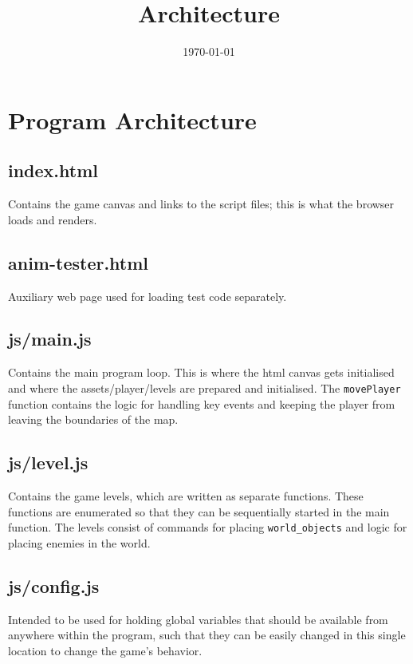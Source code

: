 \documentclass[11pt]{article}
\date{\today}
\title{Architecture}
\begin{document}
\maketitle


\section{Program Architecture}
\label{sec:orgc9acaa6}
\subsection{index.html}
\label{sec:org3660155}
Contains the game canvas and links to the script files; this is what the browser loads and renders.\\
\subsection{anim-tester.html}
\label{sec:org66015cd}
Auxiliary web page used for loading test code separately.\\
\subsection{js/main.js}
\label{sec:orgeadcae2}
Contains the main program loop. This is where the html canvas gets initialised and where the assets/player/levels are prepared and initialised. The \texttt{movePlayer} function contains the logic for handling key events and keeping the player from leaving the boundaries of the map.\\
\subsection{js/level.js}
\label{sec:orgab68a68}
Contains the game levels, which are written as separate functions. These functions are enumerated so that they can be sequentially started in the main function. The levels consist of commands for placing \texttt{world\_objects} and logic for placing enemies in the world.\\
\subsection{js/config.js}
\label{sec:orgbff7f03}
Intended to be used for holding global variables that should be available from anywhere within the program, such that they can be easily changed in this single location to change the game's behavior.\\
\end{document}
